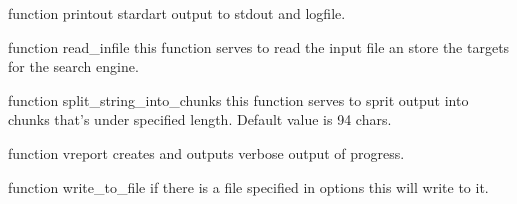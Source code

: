 \documentclass[letterpaper,10pt,english]{sphinxmanual}
\begin{document}

\begin{fulllineitems}
\label{tracemac:tracemac.printout}
function printout
stardart output to stdout and logfile.

\end{fulllineitems}


\begin{fulllineitems}
\label{tracemac:tracemac.read_infile}
function read\_infile
this function serves to read the input file an store the targets for the search engine.

\end{fulllineitems}


\begin{fulllineitems}
\label{tracemac:tracemac.split_string_into_chunks}
function split\_string\_into\_chunks
this function serves to sprit output into chunks that's under specified length.
Default value is 94 chars.

\end{fulllineitems}


\begin{fulllineitems}
\label{tracemac:tracemac.vreport}
function vreport
creates and outputs verbose output of progress.

\end{fulllineitems}


\begin{fulllineitems}
\label{tracemac:tracemac.write_to_file}
function write\_to\_file
if there is a file specified in options this will write to it.

\end{fulllineitems}
\end{document}
